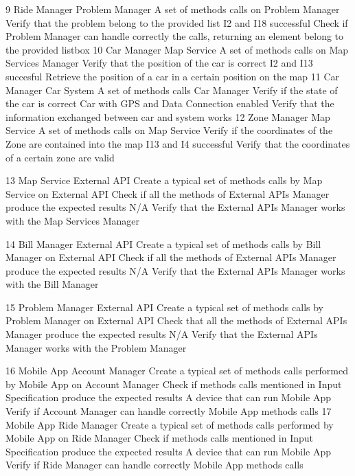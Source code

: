 \testCase
	{9}
	{Ride Manager}
	{Problem Manager}
	{A set of methods calls on Problem Manager}
	{Verify that the problem belong to the provided list}
	{I2 and I18 successful}
	{Check if Problem Manager can handle correctly the calls, returning an element belong to the provided listbox}
\testCase
	{10}
	{Car Manager}
	{Map Service}
	{A set of methods calls on Map Services Manager}
	{Verify that the position of the car is correct}
	{I2 and I13 succesful}
	{Retrieve the position of a car in a certain position on the map}
\testCase
	{11}
	{Car Manager}
	{Car System}
	{A set of methods calls Car Manager}
	{Verify if the state of the car is correct}
	{Car with GPS and Data Connection enabled}
	{Verify that the information exchanged between car and system works}
\testCase
	{12}
	{Zone Manager}
	{Map Service}
	{A set of methods calls on Map Service}
	{Verify if the coordinates of the Zone are contained into the map}
	{I13 and I4 successful}
	{Verify that the coordinates of a certain zone are valid}
	
\testCase
	{13}
	{Map Service}
	{External API}
	{Create a typical set of methods calls by Map Service on External API}
	{Check if all the methods of External  APIs Manager produce the expected results}
	{N/A}
	{Verify that the External APIs Manager works  with the Map Services Manager}
	
\testCase
	{14}
	{Bill Manager}
	{External API}
	{Create a typical set of methods calls by Bill Manager on External API}
	{Check if all the methods of External   APIs Manager produce the expected results}
	{N/A}
	{Verify that the External APIs Manager works  with the Bill Manager}

\testCase
	{15}
	{Problem Manager}
	{External API}
	{Create a typical set of methods calls by Problem Manager on External API}
	{Check that all the methods of External   APIs Manager produce the expected results}
	{N/A}
	{Verify that the External APIs Manager works  with the Problem Manager}

\testCase
	{16}
	{Mobile App}
	{Account Manager}
	{Create a typical set of methods calls performed by Mobile App on Account Manager}
	{Check if methods calls mentioned in Input Specification produce the expected results}
	{A device that can run Mobile App}
	{Verify  if Account Manager can handle correctly Mobile App methods calls}
\testCase
	{17}
	{Mobile App}
	{Ride Manager}
	{Create a typical set of methods calls performed by Mobile App on Ride Manager}
	{Check if methods calls mentioned in Input Specification produce the expected results}
	{A device that can run Mobile App}
	{Verify  if Ride Manager can handle correctly Mobile App methods calls}

